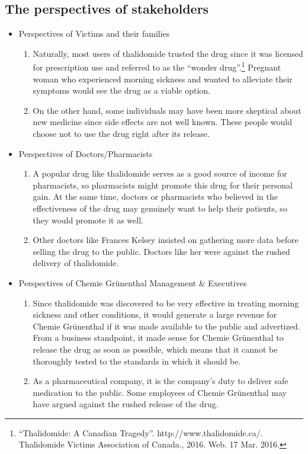 \documentclass[8pt]{article}
\newcommand{\q}[1]{``#1''}
\begin{document}
\subsection{The perspectives of stakeholders}  
\begin{itemize}

\item Perspectives of Victims and their families

\begin{enumerate} 
\item Naturally, most users of thalidomide trusted the drug since it was licensed for prescription use and referred to as the \q{wonder drug}.\footnote{\q{Thalidomide: A Canadian Tragedy}. http://www.thalidomide.ca/. Thalidomide Victims Association of Canada., 2016. Web. 17 Mar. 2016.} Pregnant woman who experienced morning sickness and wanted to alleviate their symptoms would see the drug as a viable option.
\item 
On the other hand, some individuals may have been more skeptical about new medicine since side effects are not well known. These people would choose not to use the drug right after its release.
\end{enumerate}

\item Perspectives of Doctors/Pharmacists

\begin{enumerate} 
\item A popular drug like thalidomide serves as a good source of income for pharmacists, so pharmacists might promote this drug for their personal gain. At the same time, doctors or pharmacists who believed in the effectiveness of the drug may genuinely want to help their patients, so they would promote it as well.
\item Other doctors like Frances Kelsey insisted on gathering more data before selling the drug to the public. Doctors like her were against the rushed delivery of thalidomide.
\end{enumerate}

\item Perspectives of Chemie Gr\"{u}nenthal Management \& Executives

\begin{enumerate}
\item Since thalidomide was discovered to be very effective in treating morning sickness and other conditions, it would generate a large revenue for Chemie Gr\"{u}nenthal if it was made available to the public and advertized. From a business standpoint, it made sense for Chemie Gr\"{u}nenthal to release the drug as soon as possible, which means that it cannot be thoroughly tested to the standards in which it should be.
\item As a pharmaceutical company, it is the company's duty to deliver safe medication to the public. Some employees of Chemie Gr\"{u}nenthal may have argued against the rushed release of the drug.
\end{enumerate}
\end{itemize}
\end{document}
